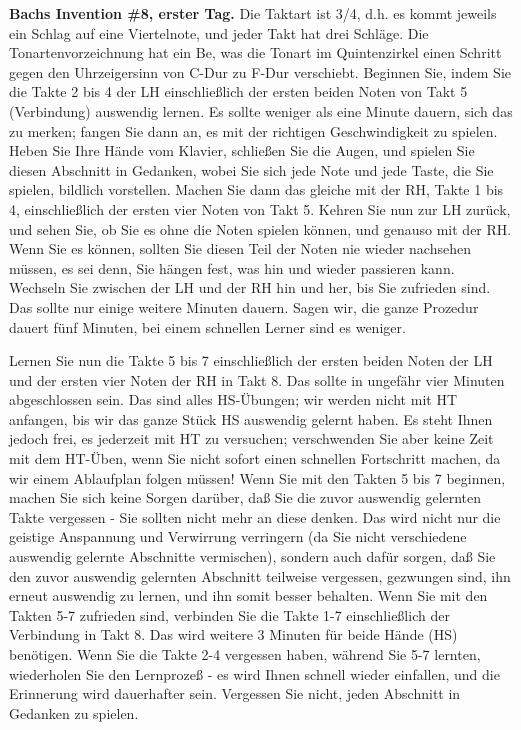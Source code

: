 
\label{c1iii6l2}

\textbf{Bachs Invention \#8, erster Tag.}
Die Taktart ist 3/4, d.h. es kommt jeweils ein Schlag auf eine Viertelnote, und jeder Takt hat drei Schläge.
Die Tonartenvorzeichnung hat ein Be, was die Tonart im Quintenzirkel einen Schritt gegen den Uhrzeigersinn von C-Dur zu F-Dur verschiebt.
Beginnen Sie, indem Sie die Takte 2 bis 4 der LH einschließlich der ersten beiden Noten von Takt 5 (Verbindung) auswendig lernen.
Es sollte weniger als eine Minute dauern, sich das zu merken; fangen Sie dann an, es mit der richtigen Geschwindigkeit zu spielen.
Heben Sie Ihre Hände vom Klavier, schließen Sie die Augen, und spielen Sie diesen Abschnitt in Gedanken, wobei Sie sich jede Note und jede Taste, die Sie spielen, bildlich vorstellen.
Machen Sie dann das gleiche mit der RH, Takte 1 bis 4, einschließlich der ersten vier Noten von Takt 5.
Kehren Sie nun zur LH zurück, und sehen Sie, ob Sie es ohne die Noten spielen können, und genauso mit der RH.
Wenn Sie es können, sollten Sie diesen Teil der Noten nie wieder nachsehen müssen, es sei denn, Sie hängen fest, was hin und wieder passieren kann.
Wechseln Sie zwischen der LH und der RH hin und her, bis Sie zufrieden sind.
Das sollte nur einige weitere Minuten dauern.
Sagen wir, die ganze Prozedur dauert fünf Minuten, bei einem schnellen Lerner sind es weniger.

Lernen Sie nun die Takte 5 bis 7 einschließlich der ersten beiden Noten der LH und der ersten vier Noten der RH in Takt 8.
Das sollte in ungefähr vier Minuten abgeschlossen sein.
Das sind alles HS-Übungen; wir werden nicht mit HT anfangen, bis wir das ganze Stück HS auswendig gelernt haben.
Es steht Ihnen jedoch frei, es jederzeit mit HT zu versuchen; verschwenden Sie aber keine Zeit mit dem HT-Üben, wenn Sie nicht sofort einen schnellen Fortschritt machen, da wir einem Ablaufplan folgen müssen!
Wenn Sie mit den Takten 5 bis 7 beginnen, machen Sie sich keine Sorgen darüber, daß Sie die zuvor auswendig gelernten Takte vergessen - Sie sollten nicht mehr an diese denken.
Das wird nicht nur die geistige Anspannung und Verwirrung verringern (da Sie nicht verschiedene auswendig gelernte Abschnitte vermischen), sondern auch dafür sorgen, daß Sie den zuvor auswendig gelernten Abschnitt teilweise vergessen, gezwungen sind, ihn erneut auswendig zu lernen, und ihn somit besser behalten.
Wenn Sie mit den Takten 5-7 zufrieden sind, verbinden Sie die Takte 1-7 einschließlich der Verbindung in Takt 8.
Das wird weitere 3 Minuten für beide Hände (HS) benötigen.
Wenn Sie die Takte 2-4 vergessen haben, während Sie 5-7 lernten, wiederholen Sie den Lernprozeß - es wird Ihnen schnell wieder einfallen, und die Erinnerung wird dauerhafter sein.
Vergessen Sie nicht, jeden Abschnitt in Gedanken zu spielen.

